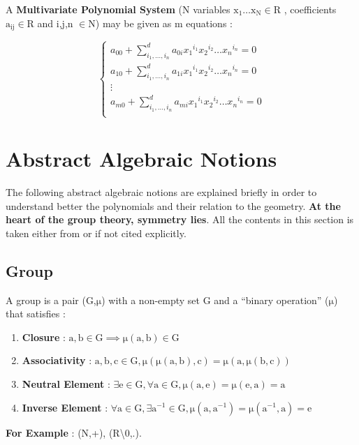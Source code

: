 \documentclass[11pt]{article}
\begin{document}
A \textbf{Multivariate Polynomial System}  (N variables  $\mathrm{x_1 \ldots x_N \in R}$ ,  coefficients  $\mathrm{a_{ij} \in R}$  and i,j,n $\mathrm{\in N}$) may be given as m equations :

\begin{equation}
   \begin{cases}
    a_{00}+\sum_{i_1,\ldots,i_n}^{d}{a_{0i}{x_1}^{i_1}{x_2}^{i_2} \ldots {x_n}^{i_n} }=0 \\
    a_{10}+\sum_{i_1,\ldots,i_n}^{d}{a_{1i}{x_1}^{i_1}{x_2}^{i_2} \ldots {x_n}^{i_n} }=0 \\
    \vdots \\
    a_{m0}+\sum_{i_1,\ldots,i_n}^{d}{a_{mi}{x_1}^{i_1}{x_2}^{i_2} \ldots {x_n}^{i_n} }=0 \\
  \end{cases}
\end{equation}


\section{Abstract Algebraic Notions}

The following abstract algebraic notions are explained briefly in order to understand better the  polynomials and their relation to the geometry. \textbf{At the heart of the group theory, symmetry lies}. All the contents in this section is taken either from \cite{abstractAlgebraBook} or \cite{coxLittleOshea} if not cited explicitly. 

\subsection{Group} 
A group is a pair (G,$\mathrm{\mu}$) with a non-empty set G and a “binary operation” ($\mathrm{\mu}$)  that satisfies  :
\begin{enumerate}
\item \textbf{Closure} : $\mathrm{a, b \in G \implies \mu(a,b) \in G}$ 
\item \textbf{Associativity} : $\mathrm{a, b, c \in G, \mu(\mu(a,b),c)=\mu(a,\mu(b,c))}$ 
\item \textbf{Neutral Element} : $\mathrm{\exists e \in G, \forall a \in G, \mu(a,e)=\mu(e,a)=a }$
\item \textbf{Inverse Element} : $\mathrm{\forall a \in G, \exists a^{-1} \in G , \mu(a,a^{-1})=\mu(a^{-1},a)=e}$ 
\end{enumerate}

\textbf{For Example} : (N,+), (R\textbackslash0,.). \\
\newline
\end{document}
